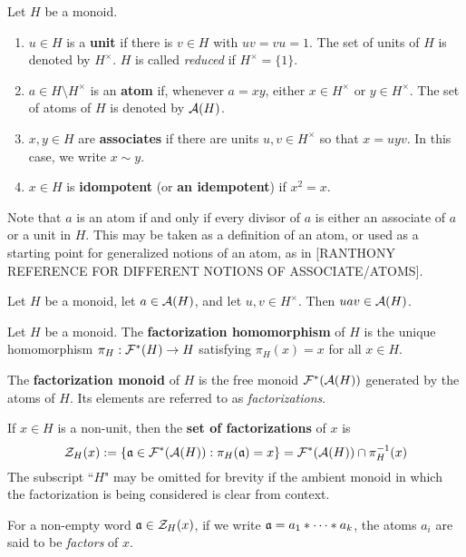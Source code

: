 \begin{defn}
Let $H$ be a monoid.
\begin{enumerate}
\item $u\in H$ is a \textbf{unit} if there is $v\in H$ with $uv = vu = 1$.  
The set of units of $H$ is denoted by $H^\times$.  
$H$ is called \textit{reduced} if $H^\times = \{1\}$.
\item $a\in H\setminus H^\times$ is an \textbf{atom} if, whenever $a = xy$, either $x\in H^\times$ or $y\in H^\times$. The set of atoms of $H$ is denoted by $\A(H)$.
\item $x,y\in H$ are \textbf{associates} if there are units $u,v\in H^\times$ so that $x = uyv$. In this case, we write $x \sim y$.
\item $x\in H$ is \textbf{idompotent} (or \textbf{an idempotent}) if $x^2 = x$.
\end{enumerate}
\end{defn}

Note that $a$ is an atom if and only if every divisor of $a$ is either an associate of $a$ or a unit in $H$.
This may be taken as a definition of an atom, or used as a starting point for generalized notions of an atom, as in [RANTHONY REFERENCE FOR DIFFERENT NOTIONS OF ASSOCIATE/ATOMS].

\begin{prop}
Let $H$ be a monoid, let $a\in \A(H)$, and let $u,v\in H^\times$.
Then $uav \in \A(H)$.
\end{prop}

\begin{defn}
Let $H$ be a monoid.
The \textbf{factorization homomorphism} of $H$ is the unique homomorphism $\pi_H: \F^*(H) \to H$ satisfying $\pi_H(x) = x$ for all $x\in H$.

The \textbf{factorization monoid} of $H$ is the free monoid $\F^*(\A(H))$ generated by the atoms of $H$.
Its elements are referred to as \textit{factorizations}.

If $x\in H$ is a non-unit, then the \textbf{set of factorizations} of $x$ is
\[ \Z_H(x) := \{ \aa\in \F^*(\A(H)) : \pi_H(\aa) = x \} = \F^*(\A(H)) \cap \pi_H^{-1}(x) \]
The subscript ``$H$" may be omitted for brevity if the ambient monoid in which the factorization is being considered is clear from context.

For a non-empty word $\aa\in \Z_H(x)$, if we write $\aa = a_1*\cdots*a_k$, the atoms $a_i$ are said to be \textit{factors} of $x$.
\end{defn}

